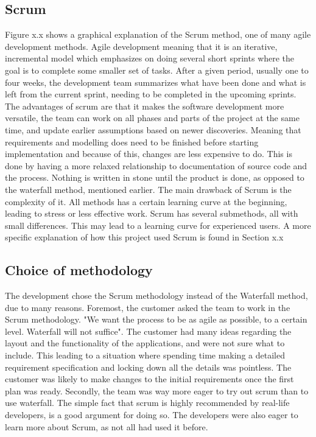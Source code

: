 \subsection{Scrum}
Figure x.x shows a graphical explanation of the Scrum method, one of many agile development methods. Agile development meaning that it is an iterative, incremental model which emphasizes on doing several short sprints where the goal is to complete some smaller set of tasks. After a given period, usually one to four weeks, the development team summarizes what have been done and what is left from the current sprint, needing to be completed in the upcoming sprints.
The advantages of scrum are that it makes the software development more versatile, the team can work on all phases and parts of the project at the same time, and update earlier assumptions based on newer discoveries. Meaning that requirements and modelling does need to be finished before starting implementation and because of this, changes are less expensive to do. This is done by having a more relaxed relationship to documentation of source code and the process.
Nothing is written in stone until the product is done, as opposed to the waterfall method, mentioned earlier.
The main drawback of Scrum is the complexity of it. All methods has a certain learning curve at the beginning, leading to stress or less effective work. Scrum has several submethods, all with small differences. This may lead to a learning curve for experienced users.
A more specific explanation of how this project used Scrum is found in Section x.x

\subsection{Choice of methodology}
The development chose the Scrum methodology instead of the Waterfall method, due to many reasons. Foremost, the customer asked the team to work in the Scrum methodology. "We want the process to be as agile as possible, to a certain level. Waterfall will not suffice". The customer had many ideas regarding the layout and the functionality of the applications, and were not sure what to include. This leading to a situation where spending time making a detailed requirement specification and locking down all the details was pointless.
The customer was likely to make changes to the initial requirements once the first plan was ready. Secondly, the team was way more eager to try out scrum than to use waterfall. The simple fact that scrum is highly recommended by real-life developers, is a good argument for doing so. The developers were also eager to learn more about Scrum, as not all had used it before.


